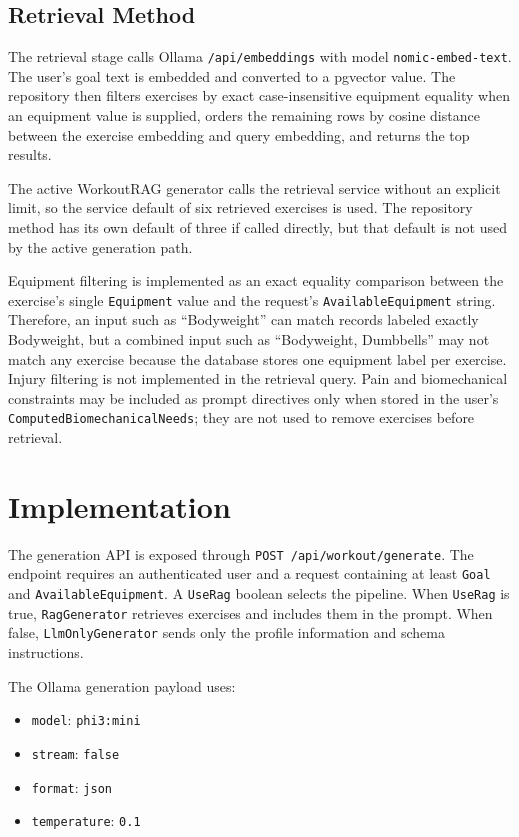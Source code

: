 \documentclass[12pt]{article}
\begin{document}
\subsection{Retrieval Method}
The retrieval stage calls Ollama \texttt{/api/embeddings} with model \texttt{nomic-embed-text}. The user's goal text is embedded and converted to a pgvector value. The repository then filters exercises by exact case-insensitive equipment equality when an equipment value is supplied, orders the remaining rows by cosine distance between the exercise embedding and query embedding, and returns the top results.

The active WorkoutRAG generator calls the retrieval service without an explicit limit, so the service default of six retrieved exercises is used. The repository method has its own default of three if called directly, but that default is not used by the active generation path.

Equipment filtering is implemented as an exact equality comparison between the exercise's single \texttt{Equipment} value and the request's \texttt{AvailableEquipment} string. Therefore, an input such as ``Bodyweight'' can match records labeled exactly Bodyweight, but a combined input such as ``Bodyweight, Dumbbells'' may not match any exercise because the database stores one equipment label per exercise. Injury filtering is not implemented in the retrieval query. Pain and biomechanical constraints may be included as prompt directives only when stored in the user's \texttt{ComputedBiomechanicalNeeds}; they are not used to remove exercises before retrieval.

\section{Implementation}
The generation API is exposed through \texttt{POST /api/workout/generate}. The endpoint requires an authenticated user and a request containing at least \texttt{Goal} and \texttt{AvailableEquipment}. A \texttt{UseRag} boolean selects the pipeline. When \texttt{UseRag} is true, \texttt{RagGenerator} retrieves exercises and includes them in the prompt. When false, \texttt{LlmOnlyGenerator} sends only the profile information and schema instructions.

The Ollama generation payload uses:
\begin{itemize}
    \item \texttt{model}: \texttt{phi3:mini}
    \item \texttt{stream}: \texttt{false}
    \item \texttt{format}: \texttt{json}
    \item \texttt{temperature}: \texttt{0.1}
\end{itemize}
\end{document}
